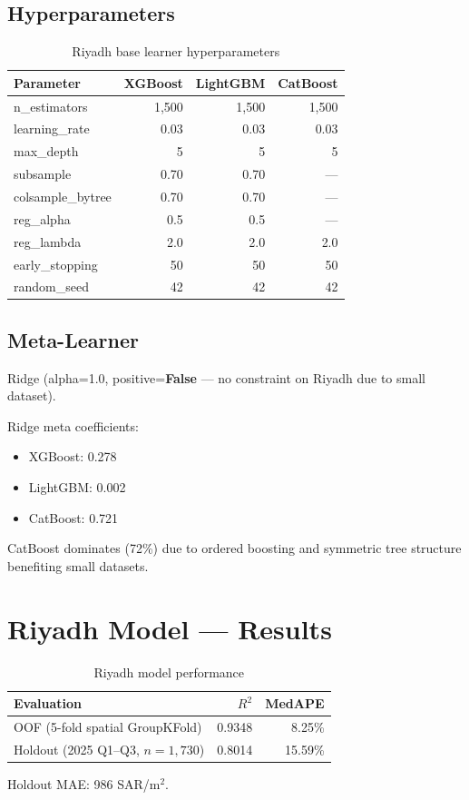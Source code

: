 \documentclass[11pt, a4paper, twoside]{report}
\begin{document}
\section{Hyperparameters}
\begin{table}[H]
  \centering
  \caption{Riyadh base learner hyperparameters}
  \begin{tabular}{lrrr}
    \toprule
    Parameter & XGBoost & LightGBM & CatBoost \\
    \midrule
    n\_estimators    & 1,500 & 1,500 & 1,500 \\
    learning\_rate   & 0.03  & 0.03  & 0.03 \\
    max\_depth       & 5     & 5     & 5 \\
    subsample        & 0.70  & 0.70  & --- \\
    colsample\_bytree& 0.70  & 0.70  & --- \\
    reg\_alpha       & 0.5   & 0.5   & --- \\
    reg\_lambda      & 2.0   & 2.0   & 2.0 \\
    early\_stopping  & 50    & 50    & 50 \\
    random\_seed     & 42    & 42    & 42 \\
    \bottomrule
  \end{tabular}
\end{table}

\section{Meta-Learner}
Ridge (alpha=1.0, positive=\textbf{False} --- no constraint on Riyadh due to
small dataset).

Ridge meta coefficients:
\begin{itemize}
  \item XGBoost: 0.278
  \item LightGBM: 0.002
  \item CatBoost: 0.721
\end{itemize}
CatBoost dominates (72\%) due to ordered boosting and symmetric tree structure
benefiting small datasets.

\chapter{Riyadh Model --- Results}
\label{ch:riyadh_results}

\begin{table}[H]
  \centering
  \caption{Riyadh model performance}
  \begin{tabular}{lrr}
    \toprule
    Evaluation & $R^2$ & MedAPE \\
    \midrule
    OOF (5-fold spatial GroupKFold)       & 0.9348 &  8.25\% \\
    Holdout (2025 Q1--Q3, $n=1{,}730$)   & 0.8014 & 15.59\% \\
    \bottomrule
  \end{tabular}
  \par\small Holdout MAE: 986 SAR/m$^2$.
\end{table}
\end{document}
